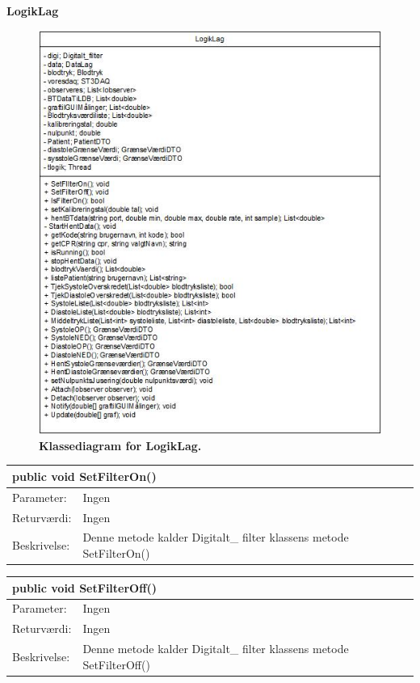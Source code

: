 \textbf{LogikLag}
\begin{figure}[H]
\includegraphics[width =1.0\textwidth , center]{billeder/klassediagramLogik}
\caption{\textbf{Klassediagram for LogikLag.}}
\end{figure}
\begin{table}[H]
\label{tab:tabel2}
\begin{tabular}{| l | p{13cm} |}
   \hline
   \multicolumn{2}{|l|}{public void SetFilterOn()} \\ \hline
   Parameter: & Ingen\\ \hline
   Returværdi: & Ingen\\ \hline
   Beskrivelse: & Denne metode kalder Digitalt\_ filter klassens metode SetFilterOn() \\ \hline
\end{tabular}
\end{table}
\begin{table}[H]
\label{tab:tabel2}
\begin{tabular}{| l | p{13cm} |}
   \hline
   \multicolumn{2}{|l|}{public void SetFilterOff()} \\ \hline
   Parameter: & Ingen\\ \hline
   Returværdi: & Ingen\\ \hline
   Beskrivelse: & Denne metode kalder Digitalt\_ filter klassens metode SetFilterOff() \\ \hline
\end{tabular}
\end{table}
